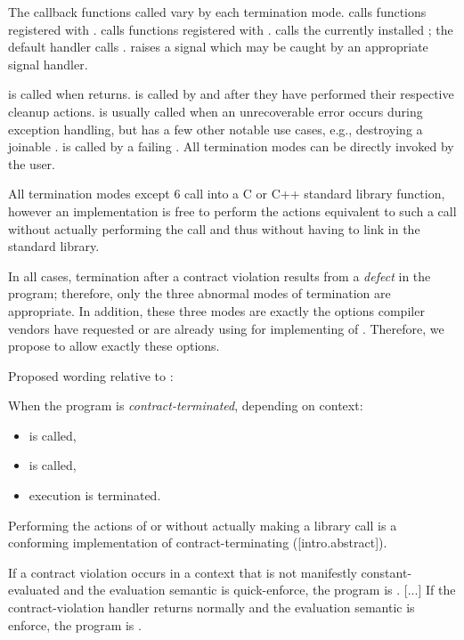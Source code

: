 The callback functions called vary by each termination mode.  calls functions registered with .  calls functions registered with .  calls the currently installed ; the default handler calls .  raises a  signal which may be caught by an appropriate signal handler.

 is called when  returns.  is called by  and  after they have performed their respective cleanup actions.  is usually called when an unrecoverable error occurs during exception handling, but has a few other notable use cases, e.g., destroying a joinable .  is called by a failing . All termination modes can be directly invoked by the user.

All termination modes except 6 call into a C or C++ standard library function, however an implementation is free to perform the actions equivalent to such a call without actually performing the call and thus without having to link in the standard library.

In all cases, termination after a contract violation results from a \emph{defect} in the program; therefore, only the three abnormal modes of termination are appropriate. In addition, these three modes are exactly the options compiler vendors have requested or are already using for implementing of \cite{P2900R11}. Therefore, we propose to allow exactly these options.

Proposed wording relative to \cite{P2900R11}:

\begin{adjustwidth}{0.5cm}{0.5cm}
\begin{addedblock}
When the program is \emph{contract-terminated}, depending on context:
\begin{itemize}
\item {} is called,
\item {} is called,
\item execution is terminated.
\end{itemize}
\begin{note}
Performing the actions of  or  without actually making a library call is a conforming implementation of contract-terminating ([intro.abstract]).
\end{note}
\end{addedblock}

If a contract violation occurs in a context that is not manifestly constant-evaluated and the evaluation semantic is quick-enforce, the program is . [...] If the contract-violation handler returns normally and the evaluation semantic is enforce, the program is .
\end{adjustwidth}

